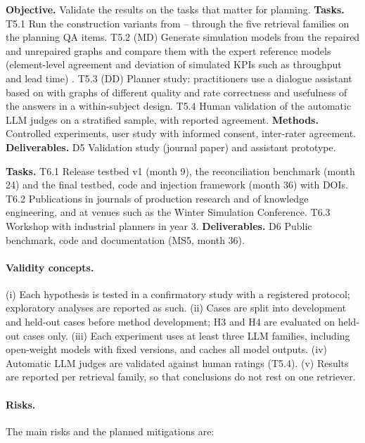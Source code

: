 \textbf{Objective.} Validate the results on the tasks that matter for planning.
\textbf{Tasks.} T5.1 Run the construction variants from -- through the five retrieval families on the planning \ac{QA} items. T5.2 (MD) Generate simulation models from the repaired and unrepaired graphs and compare them with the expert reference models (element-level agreement and deviation of simulated \acp{KPI} such as throughput and lead time) \parencite{kute2025generative}. T5.3 (DD) Planner study: practitioners use a dialogue assistant based on \parencite{ludwig2025ontology} with graphs of different quality and rate correctness and usefulness of the answers in a within-subject design. T5.4 Human validation of the automatic \ac{LLM} judges on a stratified sample, with reported agreement.
\textbf{Methods.} Controlled experiments, user study with informed consent, inter-rater agreement.
\textbf{Deliverables.} D5 Validation study (journal paper) and assistant prototype.

\textbf{Tasks.} T6.1 Release testbed v1 (month 9), the reconciliation benchmark (month 24) and the final testbed, code and injection framework (month 36) with DOIs. T6.2 Publications in journals of production research and of knowledge engineering, and at venues such as the Winter Simulation Conference. T6.3 Workshop with industrial planners in year 3.
\textbf{Deliverables.} D6 Public benchmark, code and documentation (MS5, month 36).

\paragraph{Validity concepts.}
(i) Each hypothesis is tested in a confirmatory study with a registered protocol; exploratory analyses are reported as such. (ii) Cases are split into development and held-out cases before method development; H3 and H4 are evaluated on held-out cases only. (iii) Each experiment uses at least three \ac{LLM} families, including open-weight models with fixed versions, and caches all model outputs. (iv) Automatic \ac{LLM} judges are validated against human ratings (T5.4). (v) Results are reported per retrieval family, so that conclusions do not rest on one retriever.

\paragraph{Risks.} The main risks and the planned mitigations are:

